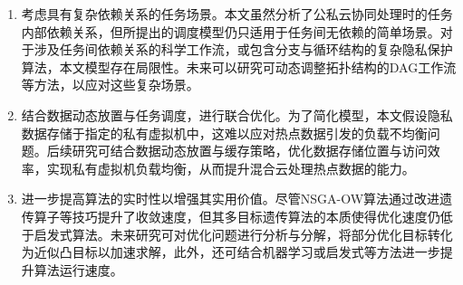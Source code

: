\begin{enumerate}
    \item 考虑具有复杂依赖关系的任务场景。本文虽然分析了公私云协同处理时的任务内部依赖关系，但所提出的调度模型仍只适用于任务间无依赖的简单场景。对于涉及任务间依赖关系的科学工作流，或包含分支与循环结构的复杂隐私保护算法，本文模型存在局限性。未来可以研究可动态调整拓扑结构的DAG工作流\cite{houssam-eddineHPCDAGTaskModel2021}等方法，以应对这些复杂场景。
    \item 结合数据动态放置与任务调度，进行联合优化。为了简化模型，本文假设隐私数据存储于指定的私有虚拟机中，这难以应对热点数据引发的负载不均衡问题。后续研究可结合数据动态放置与缓存策略\cite{kchaouPSOTaskScheduling2022,wangCostDrivenDataCaching2021}，优化数据存储位置与访问效率，实现私有虚拟机负载均衡，从而提升混合云处理热点数据的能力。
    \item 进一步提高算法的实时性以增强其实用价值。尽管NSGA-OW算法通过改进遗传算子等技巧提升了收敛速度，但其多目标遗传算法的本质使得优化速度仍低于启发式算法。未来研究可对优化问题进行分析与分解，将部分优化目标转化为近似凸目标以加速求解，此外，还可结合机器学习或启发式等方法进一步提升算法运行速度。
\end{enumerate}
